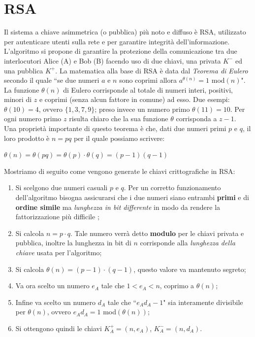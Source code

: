 \documentclass[a4paper,12pt]{tesiinfo}
\begin{document}
\section{RSA}
Il sistema a chiave asimmetrica (o pubblica) pi\`u noto e diffuso \`e RSA, utilizzato per autenticare utenti sulla rete e per garantire integrit\`a dell'informazione. L'algoritmo si propone di garantire la protezione della comunicazione tra due interlocutori Alice (A) e Bob (B) facendo uso di due chiavi, una privata $K^-$ ed una pubblica $K^+$. La matematica alla base di RSA \`e data dal \textit{Teorema di Eulero} secondo il quale ``se due numeri $a$ e $n$ sono coprimi allora $a^{\theta(n)} = 1$ mod$(n)$". La funzione $\theta(n)$ di Eulero corrisponde al totale di numeri interi, positivi, minori di $z$ e coprimi (senza alcun fattore in comune) ad esso. Due esempi: $\theta(10) = 4$, ovvero $\{1, 3, 7, 9\}$;  preso invece un numero primo $\theta(11) = 10$. Per ogni numero primo $z$ risulta chiaro che la sua funzione $\theta$ corrisponda a $z-1$. 
\\
Una propriet\`a importante di questo teorema \cite{libro 900 pagine} \`e che, dati due numeri primi $p$ e $q$, il loro prodotto \`e $n=pq$ per il quale possiamo scrivere:
\begin{center}
    $\theta (n) = \theta (pq) = \theta (p) \cdot \theta (q) = (p-1)(q-1)$
\end{center}
Mostriamo di seguito come vengono generate le chiavi crittografiche in RSA:
\begin{enumerate}
 \item Si scelgono due numeri casuali $p$ e $q$. Per un corretto funzionamento dell'algoritmo bisogna assicurarsi che i due numeri siano entrambi \textbf{primi} e di \textbf{ordine simile} ma \textit{lunghezza in bit differente} in modo da rendere la fattorizzazione pi\`u difficile \cite{RSAp+q};
 \item Si calcola $n=p \cdot q$. Tale numero verr\`a detto \textbf{modulo} per le chiavi privata e pubblica, inoltre la lunghezza in bit di $n$ corrisponde alla \textit{lunghezza della chiave} usata per l'algoritmo;
 \item Si calcola $\theta(n) = (p-1)\cdot (q-1)$, questo valore va mantenuto segreto;
 \item Va ora scelto un numero $e_A$ tale che $ 1<e_A<n$, coprimo a $\theta(n)$;
 \item Infine va scelto un numero $d_A$ tale che ``$e_Ad_A-1$" sia interamente divisibile per $\theta(n)$, ovvero $e_Ad_A= 1$ mod$(\theta(n)) $;
 \item Si ottengono quindi le chiavi $K_A^+ = (n, e_A)$, $K_A^- = (n, d_A)$.
\end{enumerate}
\end{document}
